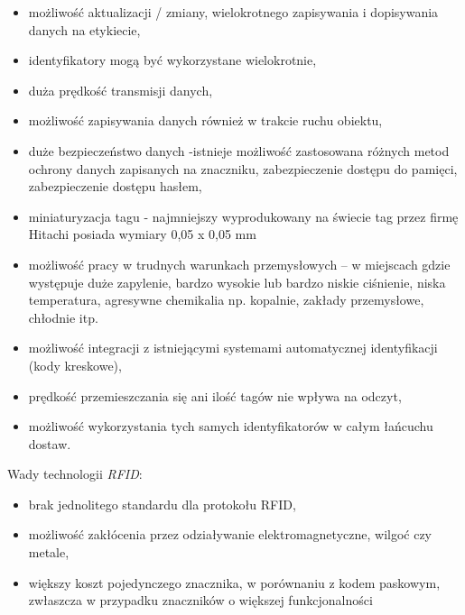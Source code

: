\begin{itemize}
\begin{itemize}
\begin{itemize}
	\item możliwość aktualizacji / zmiany, wielokrotnego zapisywania i dopisywania danych  na etykiecie,

	\item identyfikatory mogą być wykorzystane wielokrotnie,

	\item duża prędkość transmisji danych,

	\item możliwość zapisywania danych również w trakcie ruchu obiektu,

	\item duże bezpieczeństwo danych -istnieje możliwość zastosowana różnych metod ochrony danych zapisanych na znaczniku, zabezpieczenie dostępu do pamięci, zabezpieczenie dostępu hasłem,  

	\item miniaturyzacja tagu  - najmniejszy wyprodukowany na świecie tag przez firmę Hitachi posiada wymiary 0,05 x 0,05 mm

	\item możliwość pracy w trudnych warunkach przemysłowych –  w miejscach gdzie występuje duże zapylenie, bardzo wysokie lub bardzo niskie ciśnienie, niska temperatura, agresywne chemikalia np. kopalnie, zakłady przemysłowe, chłodnie itp.

	\item możliwość integracji z istniejącymi systemami automatycznej identyfikacji (kody kreskowe),

	\item prędkość przemieszczania się ani ilość tagów nie wpływa na odczyt,

	\item możliwość wykorzystania tych samych identyfikatorów w całym łańcuchu dostaw.

\end{itemize}

Wady technologii \emph{RFID}:


\begin{itemize}\setlength{\itemsep}{0pt}

	\item brak jednolitego standardu dla protokołu RFID,
	
	\item możliwość zakłócenia przez odziaływanie elektromagnetyczne, wilgoć czy metale,
 	
 	\item większy koszt pojedynczego znacznika, w porównaniu z kodem paskowym, zwłaszcza w przypadku znaczników o większej funkcjonalności 


\end{itemize}
\end{itemize}
\end{itemize}
